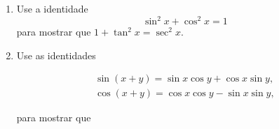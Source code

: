 \begin{enumerate}
\item Use a identidade 
$$\sin^2{x}+\cos^2{x}=1$$
para mostrar que $1+\tan^2{x}=\sec^2{x}$.

\item Use as identidades

\begin{align*}
    \sin(x+ y)=\sin{x}\cos{y}+ \cos{x}\sin{y},\\
\cos(x+y) = \cos{x}\cos{y}- \sin{x}\sin{y},
\end{align*}


para mostrar que 
\begin{enumerate}
\end{enumerate}


\end{enumerate}

